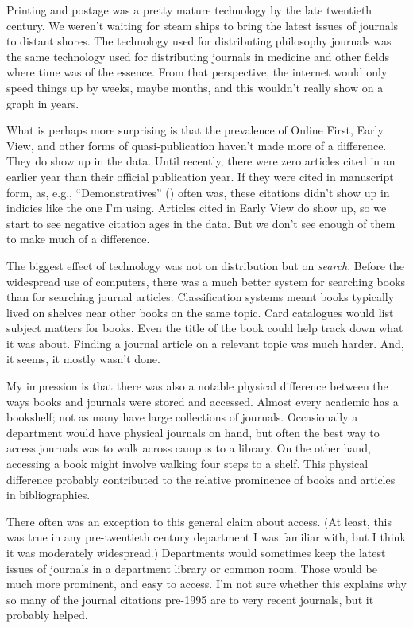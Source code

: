 \documentclass[
  12pt,
  letterpaper,
  DIV=11,
  numbers=noendperiod]{scrartcl}
\begin{document}
Printing and postage was a pretty mature technology by the late
twentieth century. We weren't waiting for steam ships to bring the
latest issues of journals to distant shores. The technology used for
distributing philosophy journals was the same technology used for
distributing journals in medicine and other fields where time was of the
essence. From that perspective, the internet would only speed things up
by weeks, maybe months, and this wouldn't really show on a graph in
years.

What is perhaps more surprising is that the prevalence of Online First,
Early View, and other forms of quasi-publication haven't made more of a
difference. They do show up in the data. Until recently, there were zero
articles cited in an earlier year than their official publication year.
If they were cited in manuscript form, as, e.g., ``Demonstratives''
() often was, these citations
didn't show up in indicies like the one I'm using. Articles cited in
Early View do show up, so we start to see negative citation ages in the
data. But we don't see enough of them to make much of a difference.

The biggest effect of technology was not on distribution but on
\emph{search}. Before the widespread use of computers, there was a much
better system for searching books than for searching journal articles.
Classification systems meant books typically lived on shelves near other
books on the same topic. Card catalogues would list subject matters for
books. Even the title of the book could help track down what it was
about. Finding a journal article on a relevant topic was much harder.
And, it seems, it mostly wasn't done.

My impression is that there was also a notable physical difference
between the ways books and journals were stored and accessed. Almost
every academic has a bookshelf; not as many have large collections of
journals. Occasionally a department would have physical journals on
hand, but often the best way to access journals was to walk across
campus to a library. On the other hand, accessing a book might involve
walking four steps to a shelf. This physical difference probably
contributed to the relative prominence of books and articles in
bibliographies.

There often was an exception to this general claim about access. (At
least, this was true in any pre-twentieth century department I was
familiar with, but I think it was moderately widespread.) Departments
would sometimes keep the latest issues of journals in a department
library or common room. Those would be much more prominent, and easy to
access. I'm not sure whether this explains why so many of the journal
citations pre-1995 are to very recent journals, but it probably helped.
\end{document}
